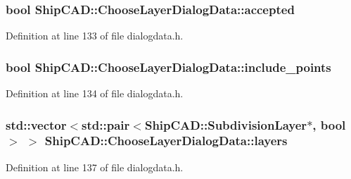 \subsubsection[{\texorpdfstring{accepted}{accepted}}]{\setlength{\rightskip}{0pt plus 5cm}bool Ship\+C\+A\+D\+::\+Choose\+Layer\+Dialog\+Data\+::accepted}\hypertarget{structShipCAD_1_1ChooseLayerDialogData_a96cae0954fbe02423cdaee90c5983da2}{}\label{structShipCAD_1_1ChooseLayerDialogData_a96cae0954fbe02423cdaee90c5983da2}


Definition at line 133 of file dialogdata.\+h.

\subsubsection[{\texorpdfstring{include\+\_\+points}{include_points}}]{\setlength{\rightskip}{0pt plus 5cm}bool Ship\+C\+A\+D\+::\+Choose\+Layer\+Dialog\+Data\+::include\+\_\+points}\hypertarget{structShipCAD_1_1ChooseLayerDialogData_a24787e5e75c8a507eb02c5152dcf1209}{}\label{structShipCAD_1_1ChooseLayerDialogData_a24787e5e75c8a507eb02c5152dcf1209}


Definition at line 134 of file dialogdata.\+h.

\subsubsection[{\texorpdfstring{layers}{layers}}]{\setlength{\rightskip}{0pt plus 5cm}std\+::vector$<$std\+::pair$<${\bf Ship\+C\+A\+D\+::\+Subdivision\+Layer}$\ast$, bool$>$ $>$ Ship\+C\+A\+D\+::\+Choose\+Layer\+Dialog\+Data\+::layers}\hypertarget{structShipCAD_1_1ChooseLayerDialogData_abf3c16e3322c1f9b93822204dd2ee825}{}\label{structShipCAD_1_1ChooseLayerDialogData_abf3c16e3322c1f9b93822204dd2ee825}


Definition at line 137 of file dialogdata.\+h.

